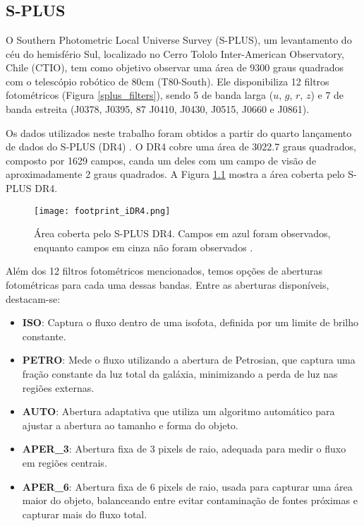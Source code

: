 \chapter{\chapternamedatabase}\label{database}


\section{S-PLUS}
O Southern Photometric Local Universe Survey (S-PLUS), um levantamento do céu do hemisfério Sul, localizado no Cerro Tololo Inter-American Observatory, Chile (CTIO), tem como objetivo observar uma área de 9300 graus quadrados com o telescópio robótico de 80cm (T80-South). Ele disponibiliza 12 filtros fotométricos (Figura \ref{splus_filters}), sendo 5 de banda larga ($u$, $g$, $r$, $z$) e 7 de banda estreita (J0378, J0395,
87 J0410, J0430, J0515, J0660 e J0861).

\vspace{\baselineskip}

Os dados utilizados neste trabalho foram obtidos a partir do quarto lançamento de dados do S-PLUS (DR4) \cite{herpich2024fourthsplusdatarelease}. O DR4 cobre uma área de 3022.7 graus quadrados, composto por 1629 campos, canda um deles com um campo de visão de aproximadamente 2 graus quadrados. A Figura \ref{footprint_iDR4} mostra a área coberta pelo S-PLUS DR4.

\begin{figure}[!ht]
    \begin{center}
    \texttt{[image: footprint\_iDR4.png]}
    \caption[]{Área coberta pelo S-PLUS DR4. Campos em azul foram observados, enquanto campos em cinza não foram observados \cite{splus_DR4_footprint}.}
    \label{footprint_iDR4}
    \end{center}
\end{figure}

Além dos 12 filtros fotométricos mencionados, temos opções de aberturas fotométricas para cada uma dessas bandas. Entre as aberturas disponíveis, destacam-se:

\begin{itemize}
    \item \textbf{ISO}: Captura o fluxo dentro de uma isofota, definida por um limite de brilho constante.
    \item \textbf{PETRO}: Mede o fluxo utilizando a abertura de Petrosian, que captura uma fração constante da luz total da galáxia, minimizando a perda de luz nas regiões externas.
    \item \textbf{AUTO}: Abertura adaptativa que utiliza um algoritmo automático para ajustar a abertura ao tamanho e forma do objeto.
    \item \textbf{APER\_3}: Abertura fixa de 3 pixels de raio, adequada para medir o fluxo em regiões centrais.
    \item \textbf{APER\_6}: Abertura fixa de 6 pixels de raio, usada para capturar uma área maior do objeto, balanceando entre evitar contaminação de fontes próximas e capturar mais do fluxo total.
\end{itemize}

